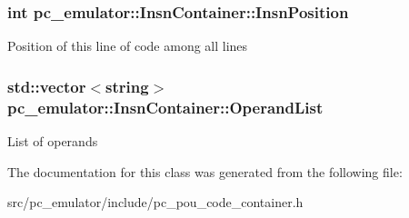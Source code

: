 \subsubsection[{\texorpdfstring{Insn\+Position}{InsnPosition}}]{\setlength{\rightskip}{0pt plus 5cm}int pc\+\_\+emulator\+::\+Insn\+Container\+::\+Insn\+Position}\hypertarget{classpc__emulator_1_1InsnContainer_a682a1868ddc3693127e0903676a3d137}{}\label{classpc__emulator_1_1InsnContainer_a682a1868ddc3693127e0903676a3d137}
Position of this line of code among all lines 
\subsubsection[{\texorpdfstring{Operand\+List}{OperandList}}]{\setlength{\rightskip}{0pt plus 5cm}std\+::vector$<$string$>$ pc\+\_\+emulator\+::\+Insn\+Container\+::\+Operand\+List}\hypertarget{classpc__emulator_1_1InsnContainer_aa6165ed97e70f77e2cf877e173fbb277}{}\label{classpc__emulator_1_1InsnContainer_aa6165ed97e70f77e2cf877e173fbb277}
List of operands 

The documentation for this class was generated from the following file\+:\begin{DoxyCompactItemize}
\item 
src/pc\+\_\+emulator/include/pc\+\_\+pou\+\_\+code\+\_\+container.\+h\end{DoxyCompactItemize}
